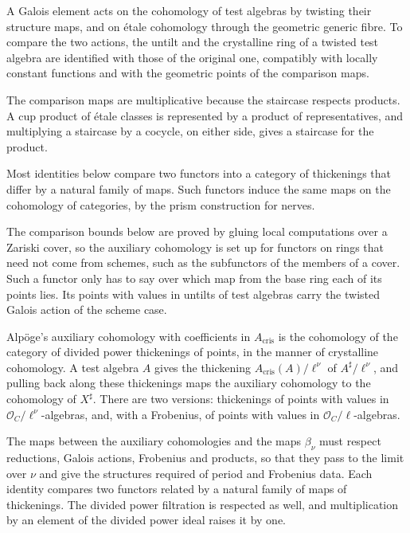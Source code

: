 A Galois element acts on the cohomology of test algebras by twisting their structure maps, and on
\'etale cohomology through the geometric generic fibre. To compare the two actions, the untilt and the
crystalline ring of a twisted test algebra are identified with those of the original one, compatibly with
locally constant functions and with the geometric points of the comparison maps.

The comparison maps are multiplicative because the staircase respects products. A cup product of
\'etale classes is represented by a product of representatives, and multiplying a staircase by a cocycle,
on either side, gives a staircase for the product.

Most identities below compare two functors into a category of thickenings that differ by a natural family
of maps. Such functors induce the same maps on the cohomology of categories, by the prism construction for
nerves.

The comparison bounds below are proved by gluing local computations over a Zariski cover, so the auxiliary
cohomology is set up for functors on rings that need not come from schemes, such as the subfunctors of the members of
a cover. Such a functor only has to say over which map from the base ring each of its points lies. Its points with
values in untilts of test algebras carry the twisted Galois action of the scheme case.

Alpöge's auxiliary cohomology with coefficients in $A_{\mathrm{cris}}$ is the cohomology of the category of
divided power thickenings of points, in the manner of crystalline cohomology. A test algebra $A$ gives the
thickening $A_{\mathrm{cris}}(A)/\ell^\nu$ of $A^\sharp/\ell^\nu$, and pulling back along these thickenings maps
the auxiliary cohomology to the cohomology of $X^\sharp$. There are two versions: thickenings of points with
values in $\mathcal O_C/\ell^\nu$-algebras, and, with a Frobenius, of points with values in $\mathcal
O_C/\ell$-algebras.

The maps between the auxiliary cohomologies and the maps $\beta_\nu$ must respect reductions, Galois
actions, Frobenius and products, so that they pass to the limit over $\nu$ and give the structures required
of period and Frobenius data. Each identity compares two functors related by a natural family of maps of
thickenings. The divided power filtration is respected as well, and multiplication by an element of the divided power
ideal raises it by one.

